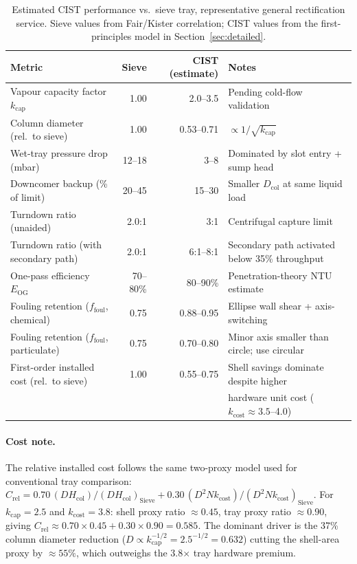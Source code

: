 \documentclass[11pt,letterpaper]{article}
\newcommand{\Eog}{E_{\mathrm{OG}}}
\newcommand{\Hcol}{H_{\mathrm{col}}}
\begin{document}
\begin{table}[H]
\centering
\caption{Estimated CIST performance vs.\ sieve tray, representative
  general rectification service.  Sieve values from Fair/Kister correlation;
  CIST values from the first-principles model in Section~\ref{sec:detailed}.}
\label{tab:performance}
\small
\begin{tabular}{lrrl}
\toprule
Metric & Sieve & CIST (estimate) & Notes\\
\midrule
Vapour capacity factor $k_{\mathrm{cap}}$
  & 1.00 & 2.0--3.5 & Pending cold-flow validation\\
Column diameter (rel.\ to sieve)
  & 1.00 & 0.53--0.71 & $\propto 1/\sqrt{k_{\mathrm{cap}}}$\\
Wet-tray pressure drop (mbar)
  & 12--18 & 3--8 & Dominated by slot entry + sump head\\
Downcomer backup (\% of limit)
  & 20--45 & 15--30 & Smaller $D_{\mathrm{col}}$ at same liquid load\\
Turndown ratio (unaided)
  & 2.0:1 & 3:1 & Centrifugal capture limit\\
Turndown ratio (with secondary path)
  & 2.0:1 & 6:1--8:1 & Secondary path activated below 35\% throughput\\
One-pass efficiency $\Eog$
  & 70--80\% & 80--90\% & Penetration-theory NTU estimate\\
Fouling retention ($f_{\mathrm{foul}}$, chemical)
  & 0.75 & 0.88--0.95 & Ellipse wall shear + axis-switching\\
Fouling retention ($f_{\mathrm{foul}}$, particulate)
  & 0.75 & 0.70--0.80 & Minor axis smaller than circle; use circular\\
First-order installed cost (rel.\ to sieve)
  & 1.00 & 0.55--0.75 & Shell savings dominate despite higher\\
  &      &            & hardware unit cost ($k_{\mathrm{cost}} \approx 3.5$--4.0)\\
\bottomrule
\end{tabular}
\end{table}

\paragraph{Cost note.}
The relative installed cost follows the same two-proxy model used for
conventional tray comparison:
$C_{\mathrm{rel}} = 0.70\,(D\Hcol)/(D\Hcol)_{\mathrm{Sieve}}
+ 0.30\,(D^2 N k_{\mathrm{cost}})/(D^2 N k_{\mathrm{cost}})_{\mathrm{Sieve}}$.
For $k_{\mathrm{cap}} = 2.5$ and $k_{\mathrm{cost}} = 3.8$:
shell proxy ratio $\approx 0.45$, tray proxy ratio $\approx 0.90$,
giving $C_{\mathrm{rel}} \approx 0.70\times0.45 + 0.30\times0.90 = 0.585$.
The dominant driver is the 37\% column diameter reduction
($D \propto k_{\mathrm{cap}}^{-1/2} = 2.5^{-1/2} = 0.632$)
cutting the shell-area proxy by $\approx 55\%$, which outweighs the
3.8$\times$ tray hardware premium.
\end{document}
